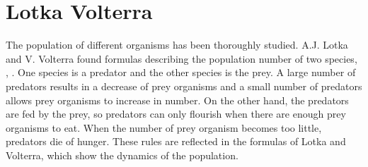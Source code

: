 \documentclass[11pt]{article}
\begin{document}
\section{Lotka Volterra}
The population of different organisms has been thoroughly studied. A.J. Lotka and V. Volterra found formulas describing the population number of two species, \cite{lotka}, \cite{volterra}. One species is a predator and the other species is the prey. A large number of predators results in a decrease of prey organisms and a small number of predators allows prey organisms to increase in number. On the other hand, the predators are fed by the prey, so predators can only flourish when there are enough prey organisms to eat. When the number of prey organism becomes too little, predators die of hunger. These rules are reflected in the formulas of Lotka and Volterra, \cite{lotkaVolterra} which show the dynamics of the population.\\
\end{document}
